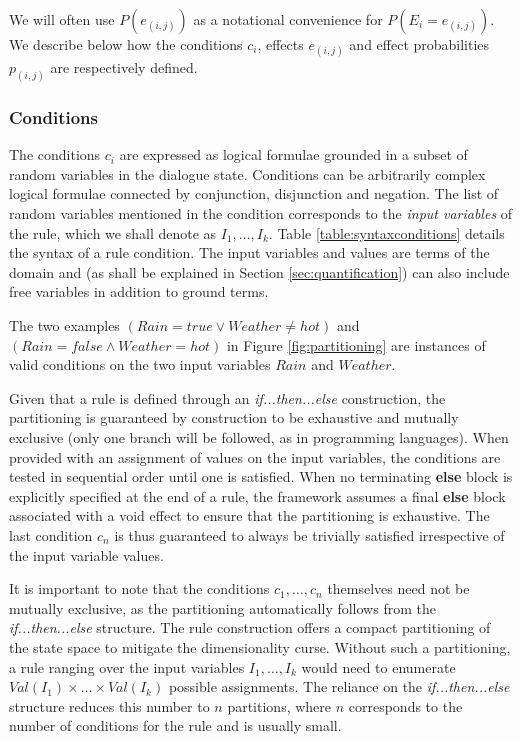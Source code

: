 We will often use $P(e_{(i,j)})$ as a notational convenience for $P(E_i = e_{(i,j)})$.   We describe below how the conditions $c_i$, effects $e_{(i,j)}$ and effect probabilities $p_{(i,j)}$ are respectively defined. 

\subsubsection*{Conditions}

The conditions $c_i$ are expressed as logical formulae grounded in a subset of random variables in the dialogue state. Conditions can be arbitrarily complex logical formulae connected by conjunction, disjunction and negation.  The list of random variables mentioned in the condition corresponds to the \textit{input variables} of the rule, which we shall denote as $I_1, \dots, I_{k}$. Table \ref{table:syntaxconditions} details the syntax of a rule condition.  The input variables and values are terms of the domain and (as shall be explained in Section \ref{sec:quantification}) can also include free variables in addition to ground terms. 

The two examples $(\mathit{Rain}\!=\mathit{true} \lor \mathit{Weather}\!\neq\mathit{hot})$ and $(\mathit{Rain}\!=\mathit{false} \land \mathit{Weather}\!=\mathit{hot})$ in Figure \ref{fig:partitioning} are instances of valid conditions on the two input variables $Rain$ and $\mathit{Weather}$. 

Given that a rule is defined through an \textit{if...then...else} construction, the partitioning is guaranteed by construction to be exhaustive and mutually exclusive (only one branch will be followed, as in programming languages).  When provided with an assignment of values on the input variables, the conditions are tested in sequential order until one is satisfied. When no terminating \textbf{else} block is explicitly specified at the end of a rule, the framework assumes a final \textbf{else} block associated with a void effect to ensure that the partitioning is exhaustive. The last condition $c_n$ is thus guaranteed to always be trivially satisfied irrespective of the input variable values. 

It is important to note that the conditions $c_1,\dots, c_n$ themselves need not be mutually exclusive, as the partitioning automatically follows from the  \textit{if...then...else} structure. The rule construction offers a compact partitioning of the state space to mitigate the dimensionality curse.  Without such a partitioning, a rule ranging over the input variables $I_1, \dots, I_{k}$ would need to enumerate $\mathit{Val}(I_1) \times \dots \times \mathit{Val}(I_k)$ possible assignments.  The reliance on the \textit{if...then...else}  structure reduces this number to $n$ partitions, where $n$ corresponds to the number of conditions for the rule and is usually small. 


